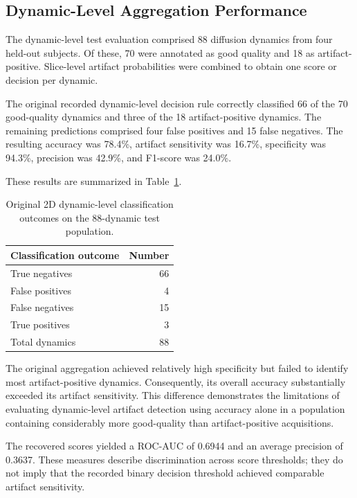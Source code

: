 \subsection{Dynamic-Level Aggregation Performance}
\label{subsec:results_dynamic_aggregation}

The dynamic-level test evaluation comprised 88 diffusion dynamics from four held-out subjects. Of these, 70 were annotated as good quality and 18 as artifact-positive. Slice-level artifact probabilities were combined to obtain one score or decision per dynamic.

The original recorded dynamic-level decision rule correctly classified 66 of the 70 good-quality dynamics and three of the 18 artifact-positive dynamics. The remaining predictions comprised four false positives and 15 false negatives. The resulting accuracy was 78.4\%, artifact sensitivity was 16.7\%, specificity was 94.3\%, precision was 42.9\%, and F1-score was 24.0\%.

These results are summarized in Table~\ref{tab:results_original_dynamic}.

\begin{table}[htbp]
\centering
\caption{Original 2D dynamic-level classification outcomes on the 88-dynamic test population.}
\label{tab:results_original_dynamic}
\begin{tabular}{lr}
\hline
Classification outcome & Number \\
\hline
True negatives & 66 \\
False positives & 4 \\
False negatives & 15 \\
True positives & 3 \\
\hline
Total dynamics & 88 \\
\hline
\end{tabular}
\end{table}

The original aggregation achieved relatively high specificity but failed to identify most artifact-positive dynamics. Consequently, its overall accuracy substantially exceeded its artifact sensitivity. This difference demonstrates the limitations of evaluating dynamic-level artifact detection using accuracy alone in a population containing considerably more good-quality than artifact-positive acquisitions.

The recovered scores yielded a ROC-AUC of 0.6944 and an average precision of 0.3637. These measures describe discrimination across score thresholds; they do not imply that the recorded binary decision threshold achieved comparable artifact sensitivity.

